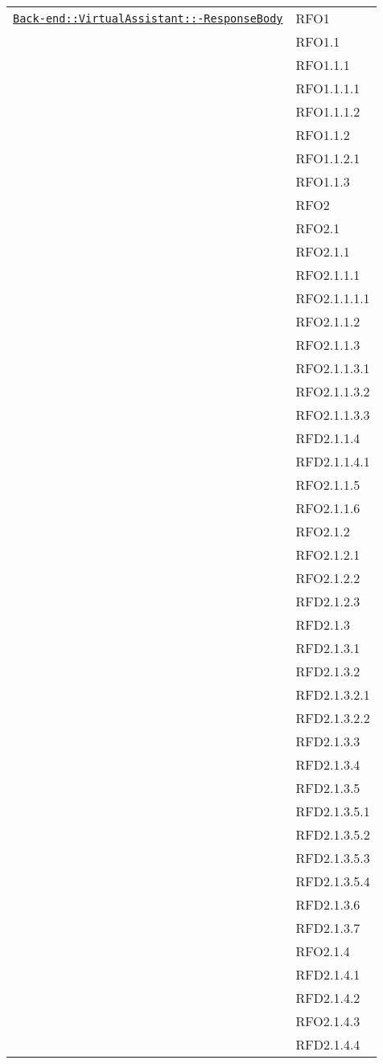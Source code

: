 \begin{longtable}{|>{\centering}m{10cm}|m{3cm}<{\centering}|}
\hyperref[Back-end::VirtualAssistant::ResponseBody]{\texttt{Back-end::VirtualAssistant::-\linebreak ResponseBody}} & RFO1\\
& RFO1.1\\
& RFO1.1.1\\
& RFO1.1.1.1\\
& RFO1.1.1.2\\
& RFO1.1.2\\
& RFO1.1.2.1\\
& RFO1.1.3\\
& RFO2\\
& RFO2.1\\
& RFO2.1.1\\
& RFO2.1.1.1\\
& RFO2.1.1.1.1\\
& RFO2.1.1.2\\
& RFO2.1.1.3\\
& RFO2.1.1.3.1\\
& RFO2.1.1.3.2\\
& RFO2.1.1.3.3\\
& RFD2.1.1.4\\
& RFD2.1.1.4.1\\
& RFO2.1.1.5\\
& RFO2.1.1.6\\
& RFO2.1.2\\
& RFO2.1.2.1\\
& RFO2.1.2.2\\
& RFD2.1.2.3\\
& RFD2.1.3\\
& RFD2.1.3.1\\
& RFD2.1.3.2\\
& RFD2.1.3.2.1\\
& RFD2.1.3.2.2\\
& RFD2.1.3.3\\
& RFD2.1.3.4\\
& RFD2.1.3.5\\
& RFD2.1.3.5.1\\
& RFD2.1.3.5.2\\
& RFD2.1.3.5.3\\
& RFD2.1.3.5.4\\
& RFD2.1.3.6\\
& RFD2.1.3.7\\
& RFO2.1.4\\
& RFD2.1.4.1\\
& RFD2.1.4.2\\
& RFO2.1.4.3\\
& RFD2.1.4.4\\

\end{longtable}
